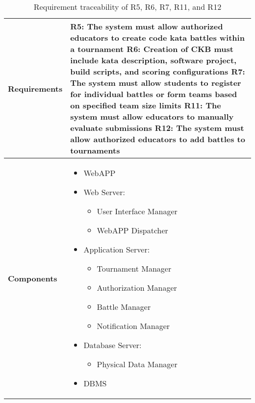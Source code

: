 \begin{table}[h!]
    \centering
    \begin{tabular}{|p{3cm}|p{12cm}|}    \hline
        \textbf{Requirements} & R5: The system must allow authorized educators to create code kata battles within a tournament \newline R6: Creation of CKB must include kata description, software project, build scripts, and scoring configurations \newline  R7: The system must allow students to register for individual battles or form teams based on specified team size limits \newline R11: The system must allow educators to manually evaluate submissions \newline R12: The system must allow authorized educators to add battles to tournaments \\
    \hline
        \textbf{Components} & 
            \begin{itemize}
                \item WebAPP
                \item Web Server:
                \begin{itemize}
                    \item User Interface Manager 
                    \item WebAPP Dispatcher
                \end{itemize}
                \item Application Server:
                \begin{itemize}
                    \item Tournament Manager
                    \item Authorization Manager
                    \item Battle Manager
                    \item Notification Manager
                \end{itemize}
                \item Database Server:
                 \begin{itemize}
                    \item Physical Data Manager
                \end{itemize}
                \item DBMS
            \end{itemize}    \\
    \hline
    \end{tabular}
    \caption{Requirement traceability of R5, R6, R7, R11, and R12}
    \label{tab:r5}
\end{table}

